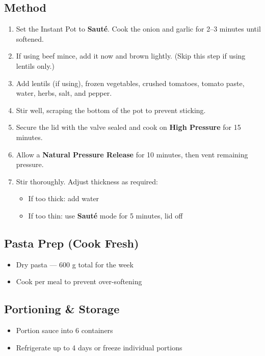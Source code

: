 \documentclass[11pt,a4paper]{article}
\begin{document}
\vspace{0.5em}

\subsection*{Method}
\begin{enumerate}
    \item Set the Instant Pot to \textbf{Sauté}. Cook the onion and garlic for 2--3 minutes until softened.
    \item If using beef mince, add it now and brown lightly. (Skip this step if using lentils only.)
    \item Add lentils (if using), frozen vegetables, crushed tomatoes, tomato paste, water, herbs, salt, and pepper.
    \item Stir well, scraping the bottom of the pot to prevent sticking.
    \item Secure the lid with the valve sealed and cook on \textbf{High Pressure} for 15 minutes.
    \item Allow a \textbf{Natural Pressure Release} for 10 minutes, then vent remaining pressure.
    \item Stir thoroughly. Adjust thickness as required:
    \begin{itemize}
        \item If too thick: add water
        \item If too thin: use \textbf{Sauté} mode for 5 minutes, lid off
    \end{itemize}
\end{enumerate}

\vspace{0.5em}

\subsection*{Pasta Prep (Cook Fresh)}
\begin{itemize}
    \item Dry pasta — 600 g total for the week
    \item Cook per meal to prevent over-softening
\end{itemize}

\vspace{0.5em}

\subsection*{Portioning \& Storage}
\begin{itemize}
    \item Portion sauce into 6 containers
    \item Refrigerate up to 4 days or freeze individual portions
\end{itemize}
\end{document}

